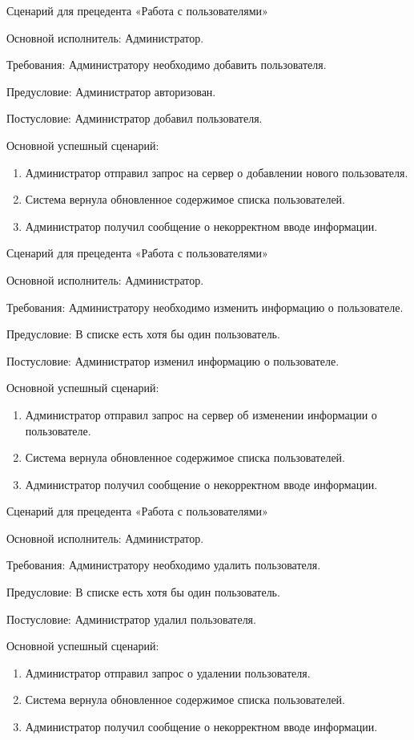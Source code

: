 Сценарий для прецедента «Работа с пользователями»

Основной исполнитель: Администратор.

Требования: Администратору необходимо добавить пользователя.

Предусловие: Администратор авторизован.

Постусловие: Администратор добавил пользователя.

Основной успешный сценарий:
\begin{enumerate}
	\item Администратор отправил запрос на сервер о добавлении нового пользователя.
	\item Система вернула обновленное содержимое списка пользователей.
	\item Администратор получил сообщение о некорректном вводе информации.\\
\end{enumerate}

Сценарий для прецедента «Работа с пользователями»

Основной исполнитель: Администратор.

Требования: Администратору необходимо изменить информацию о пользователе.

Предусловие: В списке есть хотя бы один пользователь.

Постусловие: Администратор изменил информацию о пользователе.

Основной успешный сценарий:
\begin{enumerate}
	\item Администратор отправил запрос на сервер об изменении информации о пользователе.
	\item Система вернула обновленное содержимое списка пользователей.
	\item Администратор получил сообщение о некорректном вводе информации.\\
\end{enumerate}

Сценарий для прецедента «Работа с пользователями»

Основной исполнитель: Администратор.

Требования: Администратору необходимо удалить пользователя.

Предусловие: В списке есть хотя бы один пользователь.

Постусловие: Администратор удалил пользователя.

Основной успешный сценарий:
\begin{enumerate}
	\item Администратор отправил запрос о удалении пользователя.
	\item Система вернула обновленное содержимое списка пользователей.
	\item Администратор получил сообщение о некорректном вводе информации.\\
\end{enumerate}


